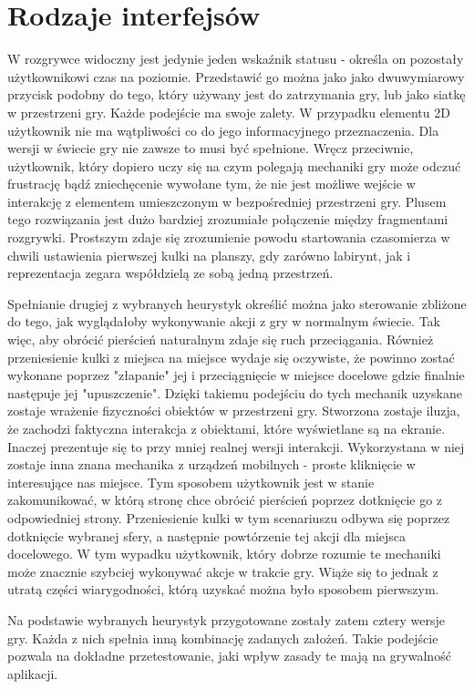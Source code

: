 \documentclass[a4paper,12pt,numbers=noenddot]{report}
\begin{document}
\section{Rodzaje interfejsów}
W rozgrywce widoczny jest jedynie jeden wskaźnik statusu - określa on pozostały użytkownikowi czas na poziomie. Przedstawić go można jako jako dwuwymiarowy przycisk podobny do tego, który używany jest do zatrzymania gry, lub jako siatkę w przestrzeni gry. Każde podejście ma swoje zalety. W przypadku elementu 2D użytkownik nie ma wątpliwości co do jego informacyjnego przeznaczenia. Dla wersji w świecie gry nie zawsze to musi być spełnione. Wręcz przeciwnie, użytkownik, który dopiero uczy się na czym polegają mechaniki gry może odczuć frustrację bądź zniechęcenie wywołane tym, że nie jest możliwe wejście w interakcję z elementem umieszczonym w bezpośredniej przestrzeni gry. Plusem tego rozwiązania jest dużo bardziej zrozumiałe połączenie między fragmentami rozgrywki. Prostszym zdaje się zrozumienie powodu startowania czasomierza w chwili ustawienia pierwszej kulki na planszy, gdy zarówno labirynt, jak i reprezentacja zegara współdzielą ze sobą jedną przestrzeń.

Spełnianie drugiej z wybranych heurystyk określić można jako sterowanie zbliżone do tego, jak wyglądałoby wykonywanie akcji z gry w normalnym świecie. Tak więc, aby obrócić pierścień naturalnym zdaje się ruch przeciągania. Również przeniesienie kulki z miejsca na miejsce wydaje się oczywiste, że powinno zostać wykonane poprzez "złapanie" jej i przeciągnięcie w miejsce docelowe gdzie finalnie następuje jej "upuszczenie". Dzięki takiemu podejściu do tych mechanik uzyskane zostaje wrażenie fizyczności obiektów w przestrzeni gry. Stworzona zostaje iluzja, że zachodzi faktyczna interakcja z obiektami, które wyświetlane są na ekranie. Inaczej prezentuje się to przy mniej realnej wersji interakcji. Wykorzystana w niej zostaje inna znana mechanika z urządzeń mobilnych - proste kliknięcie w interesujące nas miejsce. Tym sposobem użytkownik jest w stanie zakomunikować, w którą stronę chce obrócić pierścień poprzez dotknięcie go z odpowiedniej strony. Przeniesienie kulki w tym scenariuszu odbywa się poprzez dotknięcie wybranej sfery, a następnie powtórzenie tej akcji dla miejsca docelowego. W tym wypadku użytkownik, który dobrze rozumie te mechaniki może znacznie szybciej wykonywać akcje w trakcie gry. Wiąże się to jednak z utratą części wiarygodności, którą uzyskać można było sposobem pierwszym.

Na podstawie wybranych heurystyk przygotowane zostały zatem cztery wersje gry. Każda z nich spełnia inną kombinację zadanych założeń. Takie podejście pozwala na dokładne przetestowanie, jaki wpływ zasady te mają na grywalność aplikacji. 
\end{document}
